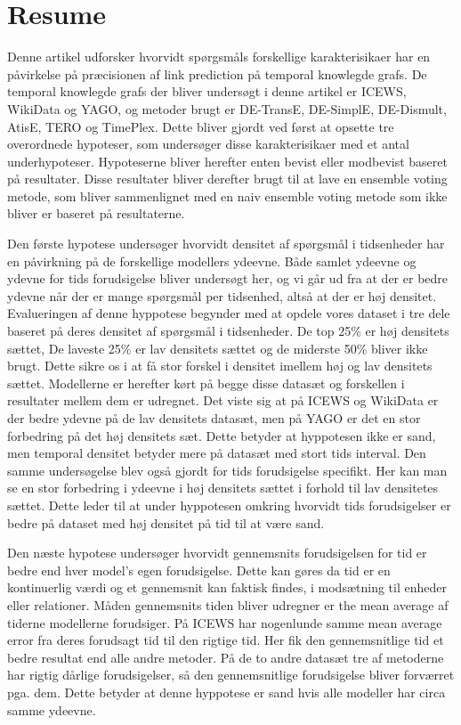 \section*{Resume}
Denne artikel udforsker hvorvidt spørgsmåls forskellige karakterisikaer har en påvirkelse på præcisionen af link prediction på temporal knowlegde grafs. De temporal knowlegde grafs der bliver undersøgt i denne artikel er ICEWS, WikiData og YAGO, og metoder brugt er DE-TransE, DE-SimplE, DE-Dismult, AtisE, TERO og TimePlex. Dette bliver gjordt ved først at opsette tre overordnede hypoteser, som undersøger disse karakterisikaer med et antal underhypoteser. Hypoteserne bliver herefter enten bevist eller modbevist baseret på resultater. Disse resultater bliver derefter brugt til at lave en ensemble voting metode, som bliver sammenlignet med en naiv ensemble voting metode som ikke bliver er baseret på resultaterne. 

Den første hypotese undersøger hvorvidt densitet af spørgsmål i tidsenheder har en påvirkning på de forskellige modellers ydeevne. Både samlet ydeevne og ydevne for tids forudsigelse bliver undersøgt her, og vi går ud fra at der er bedre ydevne når der er mange spørgsmål per tidsenhed, altså at der er høj densitet. 
Evalueringen af denne hyppotese begynder med at opdele vores dataset i tre dele baseret på deres densitet af spørgsmål i tidsenheder. De top 25\% er høj densitets sættet, De laveste 25\% er lav densitets sættet og de miderste 50\% bliver ikke brugt. Dette sikre os i at få stor forskel i densitet imellem høj og lav densitets sættet. Modellerne er herefter kørt på begge disse datasæt og forskellen i resultater mellem dem er udregnet. Det viste sig at på ICEWS og WikiData er der bedre ydevne på de lav densitets datasæt, men på YAGO er det en stor forbedring på det høj densitets sæt. Dette betyder at hyppotesen ikke er sand, men temporal densitet betyder mere på datasæt med stort tids interval. Den samme undersøgelse blev også gjordt for tids forudsigelse specifikt. Her kan man se en stor forbedring i ydeevne i høj densitets sættet i forhold til lav densitetes sættet. Dette leder til at under hyppotesen omkring hvorvidt tids forudsigelser er bedre på dataset med høj densitet på tid til at være sand. 

Den næste hypotese undersøger hvorvidt gennemsnits forudsigelsen for tid er bedre end hver model's egen forudsigelse. Dette kan gøres da tid er en kontinuerlig værdi og et gennemsnit kan faktisk findes, i modsætning til enheder eller relationer. Måden gennemsnits tiden bliver udregner er the mean average af tiderne modellerne forudsiger. På ICEWS har nogenlunde samme mean average error fra deres forudsagt tid til den rigtige tid. Her fik den gennemsnitlige tid et bedre resultat end alle andre metoder. På de to andre datasæt tre af metoderne har rigtig dårlige forudsigelser, så den gennemsnitlige forudsigelse bliver forværret pga. dem. Dette betyder at denne hyppotese er sand hvis alle modeller har circa samme ydeevne. 

